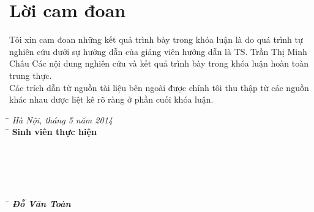 \chapter*{Lời cam đoan}
Tôi xin cam đoan những kết quả trình bày trong khóa luận là do quá trình tự nghiên cứu dưới sự hướng dẫn của giảng viên hướng dẫn là TS. Trần Thị Minh Châu
Các nội dung nghiên cứu và kết quả trình bày trong khóa luận hoàn toàn trung thực.\\

Các trích dẫn từ nguồn tài liệu bên ngoài được chính tôi thu thập từ các nguồn khác nhau được liệt kê rõ ràng ở phần cuối khóa luận.

\vspace{3 cm}
\begin{tabbing}
\hspace{3in} \= \= \kill
\> \textit{Hà Nội, tháng 5 năm 2014}\\
\hspace{3.4in} \= \= \kill
\> \textbf{Sinh viên thực hiện}\\\\\\\\\\\\
\hspace{3.5in} \= \= \kill
\> \textbf{\textit{Đỗ Văn Toàn}}
\end{tabbing}	
